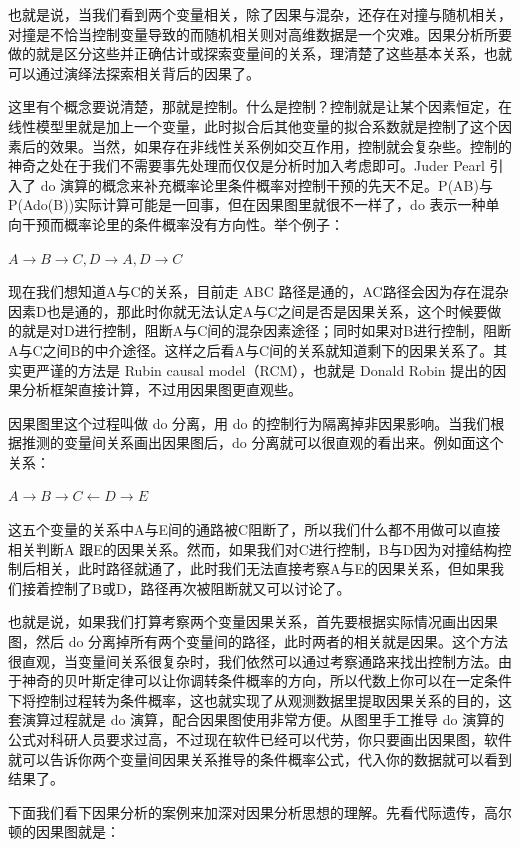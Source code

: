\documentclass[]{tufte-book}
\begin{document}
也就是说，当我们看到两个变量相关，除了因果与混杂，还存在对撞与随机相关，对撞是不恰当控制变量导致的而随机相关则对高维数据是一个灾难。因果分析所要做的就是区分这些并正确估计或探索变量间的关系，理清楚了这些基本关系，也就可以通过演绎法探索相关背后的因果了。

这里有个概念要说清楚，那就是控制。什么是控制？控制就是让某个因素恒定，在线性模型里就是加上一个变量，此时拟合后其他变量的拟合系数就是控制了这个因素后的效果。当然，如果存在非线性关系例如交互作用，控制就会复杂些。控制的神奇之处在于我们不需要事先处理而仅仅是分析时加入考虑即可。Juder Pearl 引入了 do 演算的概念来补充概率论里条件概率对控制干预的先天不足。P(A\textbar B)与P(A\textbar do(B))实际计算可能是一回事，但在因果图里就很不一样了，do 表示一种单向干预而概率论里的条件概率没有方向性。举个例子：

\(A \rightarrow B \rightarrow C, D\rightarrow A, D\rightarrow C\)

现在我们想知道A与C的关系，目前走 ABC 路径是通的，AC路径会因为存在混杂因素D也是通的，那此时你就无法认定A与C之间是否是因果关系，这个时候要做的就是对D进行控制，阻断A与C间的混杂因素途径；同时如果对B进行控制，阻断A与C之间B的中介途径。这样之后看A与C间的关系就知道剩下的因果关系了。其实更严谨的方法是 Rubin causal model（RCM），也就是 Donald Robin 提出的因果分析框架直接计算，不过用因果图更直观些。

因果图里这个过程叫做 do 分离，用 do 的控制行为隔离掉非因果影响。当我们根据推测的变量间关系画出因果图后，do 分离就可以很直观的看出来。例如面这个关系：

\(A \rightarrow B \rightarrow C \leftarrow D \rightarrow E\)

这五个变量的关系中A与E间的通路被C阻断了，所以我们什么都不用做可以直接相关判断A 跟E的因果关系。然而，如果我们对C进行控制，B与D因为对撞结构控制后相关，此时路径就通了，此时我们无法直接考察A与E的因果关系，但如果我们接着控制了B或D，路径再次被阻断就又可以讨论了。

也就是说，如果我们打算考察两个变量因果关系，首先要根据实际情况画出因果图，然后 do 分离掉所有两个变量间的路径，此时两者的相关就是因果。这个方法很直观，当变量间关系很复杂时，我们依然可以通过考察通路来找出控制方法。由于神奇的贝叶斯定律可以让你调转条件概率的方向，所以代数上你可以在一定条件下将控制过程转为条件概率，这也就实现了从观测数据里提取因果关系的目的，这套演算过程就是 do 演算，配合因果图使用非常方便。从图里手工推导 do 演算的公式对科研人员要求过高，不过现在软件已经可以代劳，你只要画出因果图，软件就可以告诉你两个变量间因果关系推导的条件概率公式，代入你的数据就可以看到结果了。

下面我们看下因果分析的案例来加深对因果分析思想的理解。先看代际遗传，高尔顿的因果图就是：
\end{document}
